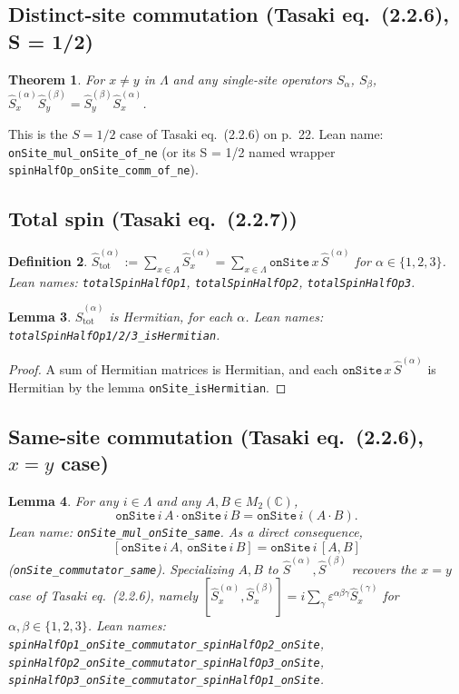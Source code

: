\documentclass[a4paper,11pt]{article}
\newtheorem{theorem}{Theorem}
\newtheorem{lemma}[theorem]{Lemma}
\newtheorem{definition}[theorem]{Definition}
\begin{document}
\subsection{Distinct-site commutation (Tasaki eq.~(2.2.6), S = 1/2)}

\begin{theorem}
For $x \neq y$ in $\Lambda$ and any single-site operators $S_\alpha$,
$S_\beta$,
$\hat S_x^{(\alpha)} \hat S_y^{(\beta)} = \hat S_y^{(\beta)} \hat S_x^{(\alpha)}$.
\end{theorem}

This is the $S = 1/2$ case of Tasaki eq.~(2.2.6) on p.~22. Lean name:
\texttt{onSite\_mul\_onSite\_of\_ne} (or its S = 1/2 named wrapper
\texttt{spinHalfOp\_onSite\_comm\_of\_ne}).

\subsection{Total spin (Tasaki eq.~(2.2.7))}

\begin{definition}
$\hat S_{\mathrm{tot}}^{(\alpha)}
  := \sum_{x \in \Lambda} \hat S_x^{(\alpha)}
  = \sum_{x \in \Lambda} \texttt{onSite}\,x\,\hat S^{(\alpha)}$
for $\alpha \in \{1, 2, 3\}$. Lean names:
\texttt{totalSpinHalfOp1}, \texttt{totalSpinHalfOp2},
\texttt{totalSpinHalfOp3}.
\end{definition}

\begin{lemma}
$\hat S_{\mathrm{tot}}^{(\alpha)}$ is Hermitian, for each $\alpha$.
Lean names: \texttt{totalSpinHalfOp1/2/3\_isHermitian}.
\end{lemma}

\begin{proof}
A sum of Hermitian matrices is Hermitian, and each
$\texttt{onSite}\,x\,\hat S^{(\alpha)}$ is Hermitian by the lemma
\texttt{onSite\_isHermitian}.
\end{proof}

\subsection{Same-site commutation (Tasaki eq.~(2.2.6), $x = y$ case)}

\begin{lemma}
For any $i \in \Lambda$ and any $A, B \in M_2(\mathbb C)$,
\[
  \texttt{onSite}\,i\,A \cdot \texttt{onSite}\,i\,B
    = \texttt{onSite}\,i\,(A \cdot B).
\]
Lean name: \texttt{onSite\_mul\_onSite\_same}. As a direct consequence,
\[
  [\texttt{onSite}\,i\,A,\,\texttt{onSite}\,i\,B]
    = \texttt{onSite}\,i\,[A, B]
\]
(\texttt{onSite\_commutator\_same}). Specializing $A, B$ to
$\hat S^{(\alpha)}, \hat S^{(\beta)}$ recovers the $x = y$ case of
Tasaki eq.~(2.2.6), namely
$[\hat S_x^{(\alpha)}, \hat S_x^{(\beta)}]
  = i \sum_\gamma \varepsilon^{\alpha\beta\gamma} \hat S_x^{(\gamma)}$
for $\alpha, \beta \in \{1, 2, 3\}$. Lean names:
\texttt{spinHalfOp1\_onSite\_commutator\_spinHalfOp2\_onSite},
\texttt{spinHalfOp2\_onSite\_commutator\_spinHalfOp3\_onSite},
\texttt{spinHalfOp3\_onSite\_commutator\_spinHalfOp1\_onSite}.
\end{lemma}
\end{document}
